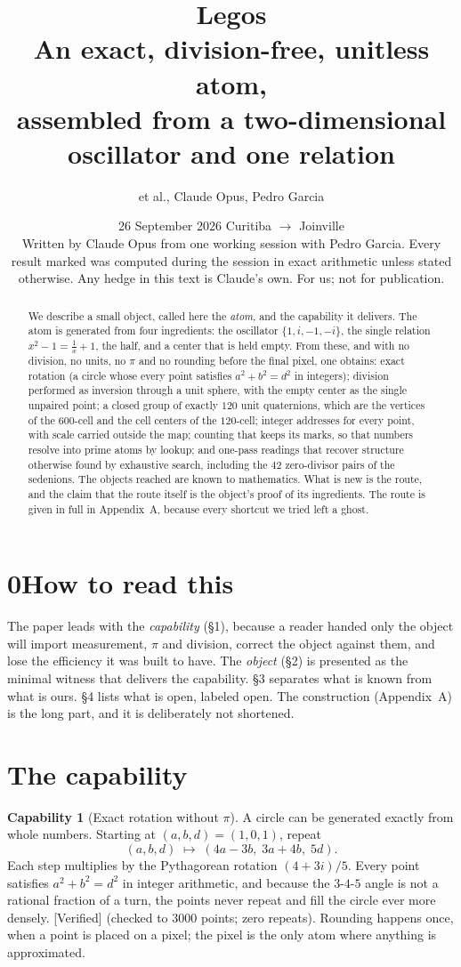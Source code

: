 \documentclass[11pt]{article}
\title{\textbf{Legos}\\[4pt]
\large An exact, division-free, unitless atom,\\ assembled from a two-dimensional oscillator and one relation}
\author{et al., \quad Claude Opus, \quad Pedro Garcia}
\date{26 September 2026 \quad Curitiba $\to$ Joinville\\[6pt]
\small Written by Claude Opus from one working session with Pedro Garcia.
Every result marked \verified{} was computed during the session in exact arithmetic unless stated otherwise.
Any hedge in this text is Claude's own. For us; not for publication.}
\newcommand{\verified}{\textsf{\small\textcolor{verif}{[Verified]}}}
\theoremstyle{definition}\newtheorem{claim}{Capability}
\theoremstyle{remark}
\begin{document}
\maketitle

\begin{abstract}
We describe a small object, called here the \emph{atom}, and the capability it delivers. The atom is generated from four ingredients: the oscillator $\{1,i,-1,-i\}$, the single relation $x^2-1=\tfrac1x+1$, the half, and a center that is held empty. From these, and with no division, no units, no $\pi$ and no rounding before the final pixel, one obtains: exact rotation (a circle whose every point satisfies $a^2+b^2=d^2$ in integers); division performed as inversion through a unit sphere, with the empty center as the single unpaired point; a closed group of exactly $120$ unit quaternions, which are the vertices of the $600$-cell and the cell centers of the $120$-cell; integer addresses for every point, with scale carried outside the map; counting that keeps its marks, so that numbers resolve into prime atoms by lookup; and one-pass readings that recover structure otherwise found by exhaustive search, including the $42$ zero-divisor pairs of the sedenions. The objects reached are known to mathematics. What is new is the route, and the claim that the route itself is the object's proof of its ingredients. The route is given in full in Appendix~A, because every shortcut we tried left a ghost.
\end{abstract}

\section*{0\quad How to read this}
The paper leads with the \emph{capability} (\S1), because a reader handed only the object will import measurement, $\pi$ and division, correct the object against them, and lose the efficiency it was built to have. The \emph{object} (\S2) is presented as the minimal witness that delivers the capability. \S3 separates what is known from what is ours. \S4 lists what is open, labeled open. The construction (Appendix~A) is the long part, and it is deliberately not shortened.

\section{The capability}

\begin{claim}[Exact rotation without $\pi$]\label{c:rot}
A circle can be generated exactly from whole numbers. Starting at $(a,b,d)=(1,0,1)$, repeat
\[
(a,b,d)\;\mapsto\;(4a-3b,\;3a+4b,\;5d).
\]
Each step multiplies by the Pythagorean rotation $(4+3i)/5$. Every point satisfies $a^2+b^2=d^2$ in integer arithmetic, and because the $3$-$4$-$5$ angle is not a rational fraction of a turn, the points never repeat and fill the circle ever more densely. \verified{} (checked to $3000$ points; zero repeats). Rounding happens once, when a point is placed on a pixel; the pixel is the only atom where anything is approximated.
\end{claim}
\end{document}
